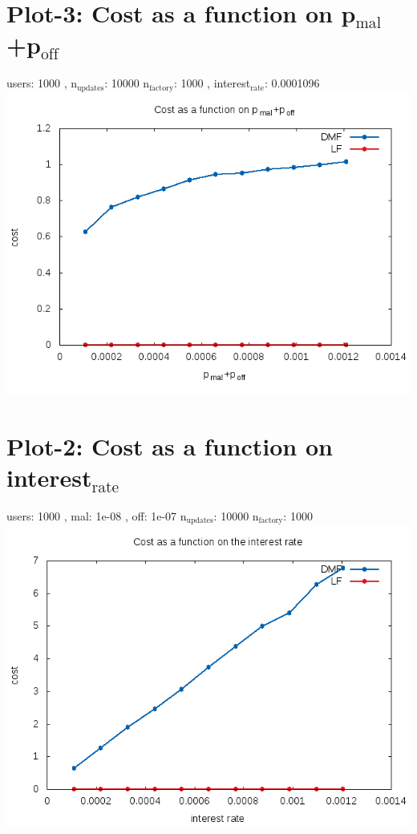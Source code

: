 \documentclass[11pt]{article}
\begin{document}
\section{Plot-3: Cost as a function on p$_{\text{mal}}$+p$_{\text{off}}$}
\label{sec-3}
users: 1000 , n$_{\text{updates}}$: 10000 n$_{\text{factory}}$: 1000 , interest$_{\text{rate}}$: 0.0001096
\includegraphics[width=.9\linewidth]{./plot-3-final.png}
\section{Plot-2: Cost as a function on interest$_{\text{rate}}$}
\label{sec-4}
users: 1000 , mal: 1e-08 , off: 1e-07 n$_{\text{updates}}$: 10000 n$_{\text{factory}}$: 1000
\includegraphics[width=.9\linewidth]{./plot-4-final.png}
\end{document}
